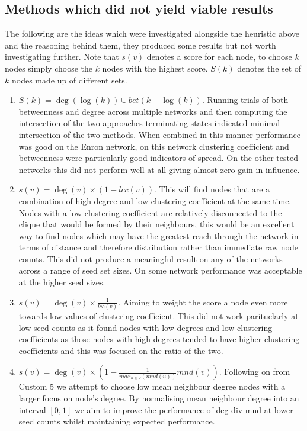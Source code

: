 \documentclass{article}
\begin{document}
\subsection{Methods which did not yield viable results}
The following are the ideas which were investigated alongside the heuristic above and the reasoning behind them, they produced some results but not worth investigating further.
Note that $s(v)$ denotes a score for each node, to choose $k$ nodes simply choose the $k$ nodes with the highest score. $S(k)$ denotes the set of $k$ nodes made up of different sets.
\begin{enumerate}
	\item $S(k) = \deg(\log(k)) \cup bet(k - \log(k))$.
	      Running trials of both betweenness and degree across multiple networks and then computing the intersection of the two approaches terminating states indicated minimal intersection of the two methods. When combined in this manner performance was good on the Enron network, on this network clustering coefficient and betweenness were particularly good indicators of spread. On the other tested networks this did not perform well at all giving almost zero gain in influence.
	\item $s(v) = \deg(v)\times(1 - lcc(v))$. This will find nodes that are a combination of high degree and low clustering coefficient at the same time.
	      Nodes with a low clustering coefficient are relatively disconnected to the clique that would be formed by their neighbours,
	      this would be an excellent way to find nodes which may have the greatest reach through the network in terms of distance and therefore distribution rather than immediate raw node counts.
	      This did not produce a meaningful result on any of the networks across a range of seed set sizes. On some network performance was acceptable at the higher seed sizes.
	\item $s(v) = \deg(v) \times \frac{1}{lcc(v)}$.
	      Aiming to weight the score a node even more towards low values of clustering coefficient. This did not work parituclarly at low seed counts as it found nodes with low degrees and low clustering coefficients as those nodes with high degrees tended to have higher clustering coefficients and this was focused on the ratio of the two.
	\item $s(v) = \deg(v) \times (1 - \frac{1}{max_{u \in V}(mnd(u))}mnd(v))$.
	      Following on from Custom 5 we attempt to choose low mean neighbour degree nodes with a larger focus on node's degree.
	      By normalising mean neighbour degree into an interval $[0, 1]$ we aim to improve the performance of deg-div-mnd at lower seed counts whilst maintaining expected performance.

\end{enumerate}
\end{document}
